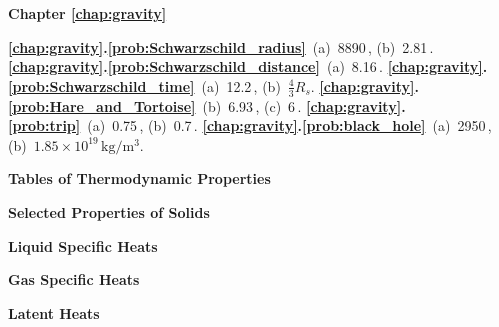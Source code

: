  \textbf{Chapter \ref{chap:gravity}}


\textbf{\ref{chap:gravity}.\ref{prob:Schwarzschild_radius}}~(a)~8890\,, (b)~2.81\,.
\textbf{\ref{chap:gravity}.\ref{prob:Schwarzschild_distance}}~(a)~8.16\,.
\textbf{\ref{chap:gravity}.\ref{prob:Schwarzschild_time}}~(a)~12.2\,, (b)~$\frac{4}{3}R_s$.
\textbf{\ref{chap:gravity}.\ref{prob:Hare_and_Tortoise}}~(b)~6.93\,, (c)~6\,.
\textbf{\ref{chap:gravity}.\ref{prob:trip}}~(a)~0.75\,, (b)~0.7\,.
\textbf{\ref{chap:gravity}.\ref{prob:black_hole}}~(a)~2950\,, (b)~$1.85\times 10^{19}\,\text{kg}/\text{m}^3$.

    







\begin{center}
\Large \textbf{
Tables of Thermodynamic Properties}
\end{center}


\begin{center}
\textbf{Selected Properties of Solids}\\ 

\end{center}





\begin{center}
\textbf{Liquid Specific Heats}\\ 


\end{center}



\begin{center}
\textbf{Gas Specific Heats}\\ 

\end{center}





\begin{center}
\textbf{Latent Heats}\\ 

\end{center}

